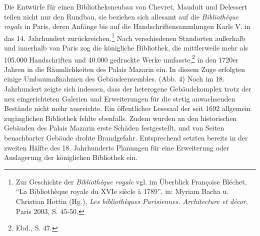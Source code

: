 Die Entwürfe für einen Bibliotheksneubau von Chevret, Mauduit und
Delessert teilen nicht nur den Rundbau, sie beziehen sich allesamt auf
die \emph{Bibliothèque royale} in Paris, deren Anfänge bis auf die
Handschriftensammlungen Karls V. in das 14. Jahrhundert
zurückreichen.\footnote{Zur Geschichte der \emph{Bibliothèque royale}
  vgl. im Überblick Françoise Bléchet, \enquote{La Bibliothèque royale
  du XVIe siècle à 1789}, in: Myriam Bacha u. Christian Hottin (Hg.),
  \emph{Les bibliothèques Parisiennes. Architecture et décor}, Paris
  2003, S. 45-50.} Nach verschiedenen Standorten außerhalb und innerhalb
von Paris zog die königliche Bibliothek, die mittlerweile mehr als
105.000 Handschriften und 40.000 gedruckte Werke umfasste,\footnote{Ebd.,
  S. 47.} in den 1720er Jahren in die Räumlichkeiten des Palais Mazarin
ein. In diesem Zuge erfolgten einige Umbaumaßnahmen des
Gebäudeensembles. (Abb. 4) Noch im 18. Jahrhundert zeigte sich indessen,
dass der heterogene Gebäudekomplex trotz der neu eingerichteten Galerien
und Erweiterungen für die stetig anwachsenden Bestände nicht mehr
ausreichte. Ein öffentlicher Lesesaal der seit 1692 allgemein
zugänglichen Bibliothek fehlte ebenfalls. Zudem wurden an den
historischen Gebäuden des Palais Mazarin erste Schäden festgestellt, und
von Seiten benachbarter Gebäude drohte Brandgefahr. Entsprechend setzten
bereits in der zweiten Hälfte des 18. Jahrhunderts Planungen für eine
Erweiterung oder Auslagerung der königlichen Bibliothek ein.

